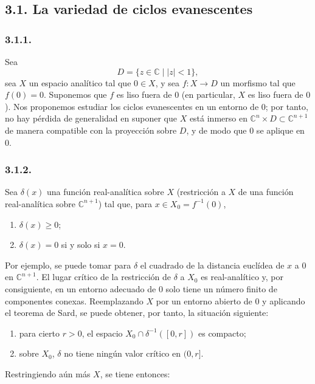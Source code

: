 \subsection*{3.1. La variedad de ciclos evanescentes}

\subsubsection*{3.1.1.}
Sea
\[
D=\{z\in\mathbb C\mid |z|<1\},
\]
sea $X$ un espacio analítico tal que $0\in X$, y sea
$f:X\to D$ un morfismo tal que $f(0)=0$. Suponemos que $f$ es liso
fuera de $0$ (en particular, $X$ es liso fuera de $0$). Nos proponemos
estudiar los ciclos evanescentes en un entorno de $0$; por tanto, no hay
pérdida de generalidad en suponer que $X$ está inmerso en
$\mathbb C^n\times D\subset\mathbb C^{n+1}$ de manera compatible con la
proyección sobre $D$, y de modo que $0$ se aplique en $0$.

\subsubsection*{3.1.2.}
Sea $\delta(x)$ una función real-analítica sobre $X$ (restricción a
$X$ de una función real-analítica sobre $\mathbb C^{n+1}$) tal que, para
$x\in X_0=f^{-1}(0)$,

\begin{enumerate}[label=(\alph*)]
\item $\delta(x)\geq 0$;
\item $\delta(x)=0$ si y solo si $x=0$.
\end{enumerate}

Por ejemplo, se puede tomar para $\delta$ el cuadrado de la distancia
euclídea de $x$ a $0$ en $\mathbb C^{n+1}$. El lugar crítico de la
restricción de $\delta$ a $X_0$ es real-analítico y, por consiguiente,
en un entorno adecuado de $0$ solo tiene un número finito de componentes
conexas. Reemplazando $X$ por un entorno abierto de $0$ y aplicando el
teorema de Sard, se puede obtener, por tanto, la situación siguiente:

\begin{enumerate}[label=(\alph*),start=3]
\item para cierto $r>0$, el espacio
  $X_0\cap\delta^{-1}([0,r])$ es compacto;
\item sobre $X_0$, $\delta$ no tiene ningún valor crítico en $(0,r]$.
\end{enumerate}

Restringiendo aún más $X$, se tiene entonces:

